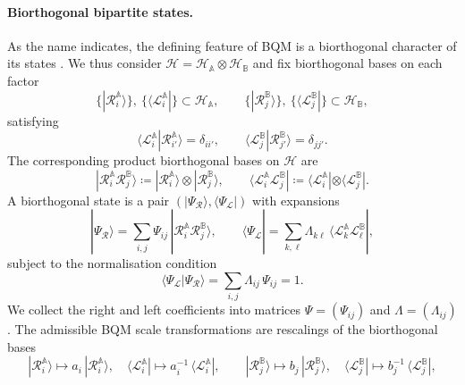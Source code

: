 \documentclass[11pt,a4paper]{article}
\begin{document}
\paragraph{Biorthogonal bipartite states.} As the name indicates, the defining feature of BQM is a biorthogonal character of its states \cite{Brody:BQM2014}. We thus consider $\mathcal H = \mathcal H_\mathbb{A} \otimes \mathcal H_\mathbb{B}$ and fix biorthogonal bases on each factor
\begin{equation}
\{|\mathcal{R}^\mathbb{A}_i\rangle\},\ \{\langle \mathcal{L}^\mathbb{A}_i|\} \subset \mathcal H_\mathbb{A},
\qquad
\{|\mathcal{R}^\mathbb{B}_j\rangle\},\ \{\langle \mathcal{L}^\mathbb{B}_j|\} \subset \mathcal H_\mathbb{B},
\end{equation}
satisfying
\begin{equation}
\langle \mathcal{L}^\mathbb{A}_i | \mathcal{R}^\mathbb{A}_{i'}\rangle = \delta_{ii'},
\qquad
\langle \mathcal{L}^\mathbb{B}_j | \mathcal{R}^\mathbb{B}_{j'}\rangle = \delta_{jj'}.
\end{equation}
The corresponding product biorthogonal bases on $\mathcal H$ are
\begin{equation}
|\mathcal{R}^\mathbb{A}_i \mathcal{R}^\mathbb{B}_j\rangle \coloneq |\mathcal{R}^\mathbb{A}_i\rangle \otimes |\mathcal{R}^\mathbb{B}_j\rangle,
\qquad
\langle \mathcal{L}^\mathbb{A}_i \mathcal{L}^\mathbb{B}_j| \coloneq \langle \mathcal{L}^\mathbb{A}_i| \otimes \langle \mathcal{L}^\mathbb{B}_j|.
\end{equation}
A biorthogonal state is a pair $(|\Psi_{\mathcal R}\rangle,\langle\Psi_{\mathcal L}|)$ with expansions
\begin{equation}
|\Psi_{\mathcal R}\rangle
= \sum_{i,j} \Psi_{ij}\,|\mathcal{R}^\mathbb{A}_i \mathcal{R}^\mathbb{B}_j\rangle,
\qquad
\langle\Psi_{\mathcal L}|
= \sum_{k,\ell} \Lambda_{k\ell}\,\langle \mathcal{L}^\mathbb{A}_k \mathcal{L}^\mathbb{B}_\ell|,
\end{equation}
subject to the normalisation condition
\begin{equation}
\langle\Psi_{\mathcal L}|\Psi_{\mathcal R}\rangle
= \sum_{i,j} \Lambda_{ij}\,\Psi_{ij} = 1.
\end{equation}
We collect the right and left coefficients into matrices
$\Psi = (\Psi_{ij})$ and $\Lambda = (\Lambda_{ij})$. The admissible BQM scale transformations are rescalings of the biorthogonal bases \cite{Edvardsson:2022day}
\begin{equation}
|\mathcal{R}^\mathbb{A}_i\rangle \mapsto a_i\,|\mathcal{R}^\mathbb{A}_i\rangle,
\quad
\langle \mathcal{L}^\mathbb{A}_i| \mapsto a_i^{-1}\,\langle \mathcal{L}^\mathbb{A}_i|,
\qquad
|\mathcal{R}^\mathbb{B}_j\rangle \mapsto b_j\,|\mathcal{R}^\mathbb{B}_j\rangle,
\quad
\langle \mathcal{L}^\mathbb{B}_j| \mapsto b_j^{-1}\,\langle \mathcal{L}^\mathbb{B}_j|,
\end{equation}
\end{document}
